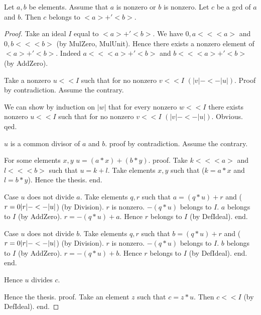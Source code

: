 \documentclass{article}
\begin{document}
\begin{forthel}
  \begin{theorem}[GCDin]
    Let $a,b$ be elements. Assume that $a$ is nonzero or $b$ is nonzero. Let $c$ be a gcd of $a$ and $b$. Then $c$ belongs to $<a> +' <b>$.
  \end{theorem}
  \begin{proof}
    Take an ideal $I$ equal to $<a> +' <b>$. We have $0,a << <a>$ and $0,b << <b>$ (by MulZero, MulUnit). Hence there exists a nonzero element of $<a> +' <b>$. Indeed $a << <a> +' <b>$ and $b << <a> +' <b>$ (by AddZero).

    Take a nonzero $u << I$ such that for no nonzero $v << I$ $(|v| -<- |u|)$.
    Proof by contradiction.
      Assume the contrary.

      We can show by induction on $|w|$ that for every nonzero $w << I$ there
        exists nonzero $u << I$ such that for no nonzero $v << I$ $(|v| -<- |u|)$.
      Obvious.
    qed.

    $u$ is a common divisor of $a$ and $b$.
    proof by contradiction.
      Assume the contrary.

      For some elements $x,y$ $u = (a * x) + (b * y)$.
      proof.
        Take $k << <a>$ and $l << <b>$ such that $u = k + l$. Take elements $x,y$ such that ($k = a * x$ and $l = b * y$). Hence the thesis.
      end.

      Case $u$ does not divide $a$.
        Take elements $q,r$ such that $a = (q * u) + r$ and ($r = 0 \/ |r| -<- |u|$) (by Division). $r$ is nonzero. $- (q * u)$ belongs to $I$. $a$ belongs to $I$ (by AddZero). $r = - (q * u) + a$. Hence $r$ belongs to $I$ (by DefIdeal).
      end.

      Case $u$ does not divide $b$.
        Take elements $q,r$ such that $b = (q * u) + r$ and ($r = 0 \/ |r| -<- |u|$) (by Division). $r$ is nonzero. $- (q * u)$ belongs to $I$. $b$ belongs to $I$ (by AddZero). $r = - (q * u) + b$. Hence $r$ belongs to $I$ (by DefIdeal).
      end.
    end.

    Hence $u$ divides $c$.

    Hence the thesis.
    proof.
      Take an element $z$ such that $c = z * u$. Then $c << I$ (by DefIdeal).
    end.
  \end{proof}
\end{forthel}
\end{document}
